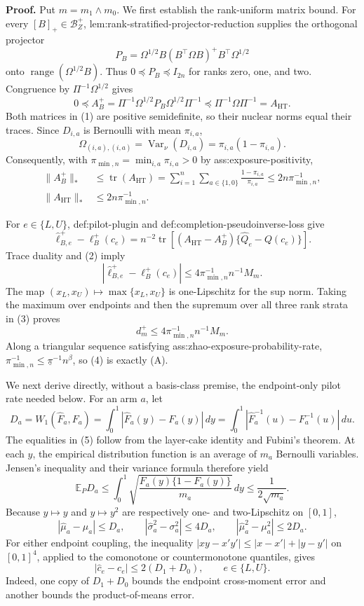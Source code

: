 \textbf{Proof.}
Put \(m=m_1\wedge m_0\).  We first establish the rank-uniform matrix bound.  For every \([B]_+\in\mathcal B_Z^+\), lem:rank-stratified-projector-reduction supplies the orthogonal projector
\[
P_B=\Omega^{1/2}B(B^{\top}\Omega B)^+B^{\top}\Omega^{1/2}
\]
onto \(\operatorname{range}(\Omega^{1/2}B)\).  Thus \(0\preceq P_B\preceq I_{2n}\) for ranks zero, one, and two.  Congruence by \(\Pi^{-1}\Omega^{1/2}\) gives
\[
0\preceq
A_B^+=\Pi^{-1}\Omega^{1/2}P_B\Omega^{1/2}\Pi^{-1}
\preceq
\Pi^{-1}\Omega\Pi^{-1}=A_{\mathrm{HT}}.
\tag{1}
\]
Both matrices in (1) are positive semidefinite, so their nuclear norms equal their traces.  Since \(D_{i,a}\) is Bernoulli with mean \(\pi_{i,a}\),
\[
\Omega_{(i,a),(i,a)}
=\operatorname{Var}_{\nu}(D_{i,a})
=\pi_{i,a}(1-\pi_{i,a}).
\]
Consequently, with \(\pi_{\min,n}=\min_{i,a}\pi_{i,a}>0\) by ass:exposure-positivity,
\[
\begin{aligned}
\lVert A_B^+\rVert_*
&\le \operatorname{tr}(A_{\mathrm{HT}})
=\sum_{i=1}^n\sum_{a\in\{1,0\}}
\frac{1-\pi_{i,a}}{\pi_{i,a}}
\le 2n\pi_{\min,n}^{-1},\\
\lVert A_{\mathrm{HT}}\rVert_*
&\le 2n\pi_{\min,n}^{-1}.
\end{aligned}
\tag{2}
\]

For \(e\in\{L,U\}\), def:pilot-plugin and def:completion-pseudoinverse-loss give
\[
\widehat\ell_{B,e}^+-\ell_B^+(c_e)
=n^{-2}\operatorname{tr}\!\left[
(A_{\mathrm{HT}}-A_B^+)\{\widehat Q_e-Q(c_e)\}
\right].
\]
Trace duality and (2) imply
\[
\left|\widehat\ell_{B,e}^+-\ell_B^+(c_e)\right|
\le 4\pi_{\min,n}^{-1}n^{-1}M_m.
\tag{3}
\]
The map \((x_L,x_U)\mapsto\max\{x_L,x_U\}\) is one-Lipschitz for the sup norm.  Taking the maximum over endpoints and then the supremum over all three rank strata in (3) proves
\[
d_m^+\le 4\pi_{\min,n}^{-1}n^{-1}M_m.
\tag{4}
\]
Along a triangular sequence satisfying ass:zhao-exposure-probability-rate, \(\pi_{\min,n}^{-1}\le\underline\pi^{-1}n^{\beta}\), so (4) is exactly (A).

We next derive directly, without a basis-class premise, the endpoint-only pilot rate needed below.  For an arm \(a\), let
\[
D_a=W_1(\widehat F_a,F_a)
=\int_0^1|\widehat F_a(y)-F_a(y)|\,dy
=\int_0^1|\widehat F_a^{-1}(u)-F_a^{-1}(u)|\,du.
\tag{5}
\]
The equalities in (5) follow from the layer-cake identity and Fubini's theorem.  At each \(y\), the empirical distribution function is an average of \(m_a\) Bernoulli variables.  Jensen's inequality and their variance formula therefore yield
\[
\mathbb E_P D_a
\le\int_0^1
\sqrt{\frac{F_a(y)\{1-F_a(y)\}}{m_a}}\,dy
\le\frac{1}{2\sqrt{m_a}}.
\tag{6}
\]
Because \(y\mapsto y\) and \(y\mapsto y^2\) are respectively one- and two-Lipschitz on \([0,1]\),
\[
|\widehat\mu_a-\mu_a|\le D_a,
\qquad
|\widehat\sigma_a^2-\sigma_a^2|\le4D_a,
\qquad
|\widehat\mu_a^2-\mu_a^2|\le2D_a.
\tag{7}
\]
For either endpoint coupling, the inequality \(|xy-x'y'|\le|x-x'|+|y-y'|\) on \([0,1]^4\), applied to the comonotone or countermonotone quantiles, gives
\[
|\widehat c_e-c_e|\le2(D_1+D_0),
\qquad e\in\{L,U\}.
\tag{8}
\]
Indeed, one copy of \(D_1+D_0\) bounds the endpoint cross-moment error and another bounds the product-of-means error.

